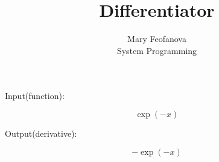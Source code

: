 \documentclass[12pt]{article}
\begin{document}
\title{Differentiator}
\author{Mary Feofanova\\
System Programming}
 
\maketitle
\begin{center}
Input(function):
\end{center}
$$\exp(-x)$$
\begin{center}
Output(derivative):
\end{center}
$$-\exp(-x)$$
\end{document}
